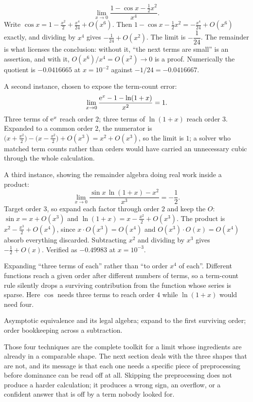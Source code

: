 \begin{worked}
\[
\lim_{x\to0}\frac{1-\cos x-\tfrac12x^{2}}{x^{4}}.
\]
Write $\cos x=1-\tfrac{x^{2}}{2}+\tfrac{x^{4}}{24}+O(x^{6})$. Then $1-\cos x-\tfrac12x^{2}=-\tfrac{x^{4}}{24}+O(x^{6})$ exactly, and dividing by $x^{4}$ gives $-\tfrac1{24}+O(x^{2})$. The limit is $-\dfrac1{24}$. The remainder is what licenses the conclusion: without it, ``the next terms are small'' is an assertion, and with it, $O(x^{6})/x^{4}=O(x^{2})\to0$ is a proof. Numerically the quotient is $-0.0416665$ at $x=10^{-2}$ against $-1/24=-0.0416667$.

A second instance, chosen to expose the term-count error:
\[
\lim_{x\to0}\frac{\mathrm{e}^{x}-1-\ln(1+x)}{x^{2}}=1 .
\]
Three terms of $\mathrm{e}^{x}$ reach order $2$; three terms of $\ln(1+x)$ reach order $3$. Expanded to a common order $2$, the numerator is $\bigl(x+\tfrac{x^{2}}{2}\bigr)-\bigl(x-\tfrac{x^{2}}{2}\bigr)+O(x^{3})=x^{2}+O(x^{3})$, so the limit is $1$; a solver who matched term counts rather than orders would have carried an unnecessary cubic through the whole calculation.

A third instance, showing the remainder algebra doing real work inside a product:
\[
\lim_{x\to0}\frac{\sin x\,\ln(1+x)-x^{2}}{x^{3}}=-\frac12 .
\]
Target order $3$, so expand each factor through order $2$ and keep the $O$: $\sin x=x+O(x^{3})$ and $\ln(1+x)=x-\tfrac{x^{2}}{2}+O(x^{3})$. The product is $x^{2}-\tfrac{x^{3}}{2}+O(x^{4})$, since $x\cdot O(x^{3})=O(x^{4})$ and $O(x^{3})\cdot O(x)=O(x^{4})$ absorb everything discarded. Subtracting $x^{2}$ and dividing by $x^{3}$ gives $-\tfrac12+O(x)$. Verified as $-0.49983$ at $x=10^{-3}$.
\end{worked}

\begin{trap}
Expanding ``three terms of each'' rather than ``to order $x^{4}$ of each''. Different functions reach a given order after different numbers of terms, so a term-count rule silently drops a surviving contribution from the function whose series is sparse. Here $\cos$ needs three terms to reach order $4$ while $\ln(1+x)$ would need four.
\end{trap}

\begin{seealsob}Asymptotic equivalence and its legal algebra; expand to the first surviving order; order bookkeeping across a subtraction.\end{seealsob}

Those four techniques are the complete toolkit for a limit whose ingredients are already in a comparable shape. The next section deals with the three shapes that are not, and its message is that each one needs a specific piece of preprocessing before dominance can be read off at all. Skipping the preprocessing does not produce a harder calculation; it produces a wrong sign, an overflow, or a confident answer that is off by a term nobody looked for.

